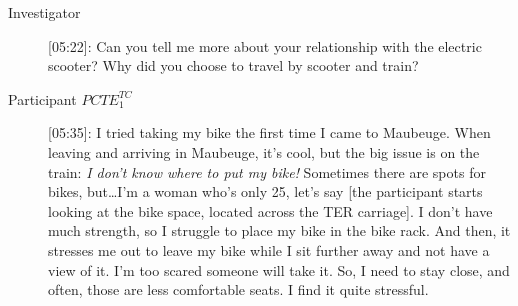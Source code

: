 \begin{description}
    \item[Investigator] [05:22]: Can you tell me more about your relationship with the electric scooter? Why did you choose to travel by scooter and train?
    \item[Participant \(PCTE^{TC}_{1}\)] [05:35]: I tried taking my bike the first time I came to Maubeuge. When leaving and arriving in Maubeuge, it’s cool, but the big issue is on the train: \textsl{I don’t know where to put my bike!} Sometimes there are spots for bikes, but\dots I’m a woman who’s only 25, let’s say [the participant starts looking at the bike space, located across the \acrshort{TER} carriage]. I don’t have much strength, so I struggle to place my bike in the bike rack. And then, it stresses me out to leave my bike while I sit further away and not have a view of it. I’m too scared someone will take it. So, I need to stay close, and often, those are less comfortable seats. I find it quite stressful.%
    

\end{description}
